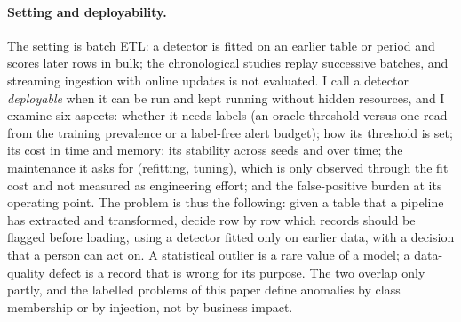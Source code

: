 \documentclass[conference]{IEEEtran}
\begin{document}
\paragraph{Setting and deployability.} The setting is batch ETL: a detector is fitted on
an earlier table or period and scores later rows in bulk; the chronological studies replay
successive batches, and streaming ingestion with online updates is not evaluated. I call a
detector \emph{deployable} when it can be run and kept running without hidden resources, and I
examine six aspects: whether it needs labels (an oracle threshold versus one read from the
training prevalence or a label-free alert budget); how its threshold is set; its cost in time and
memory; its stability across seeds and over time; the maintenance it asks for (refitting, tuning),
which is only observed through the fit cost and not measured as engineering effort; and the
false-positive burden at its operating point. The problem is thus the following: given a table that a pipeline has extracted and transformed,
decide row by row which records should be flagged before loading, using a detector fitted
only on earlier data, with a decision that a person can act on. A statistical outlier is a rare value of a model;
a data-quality defect is a record that is wrong for its purpose. The two overlap only partly, and
the labelled problems of this paper define anomalies by class membership or by injection, not by
business impact.
\end{document}

